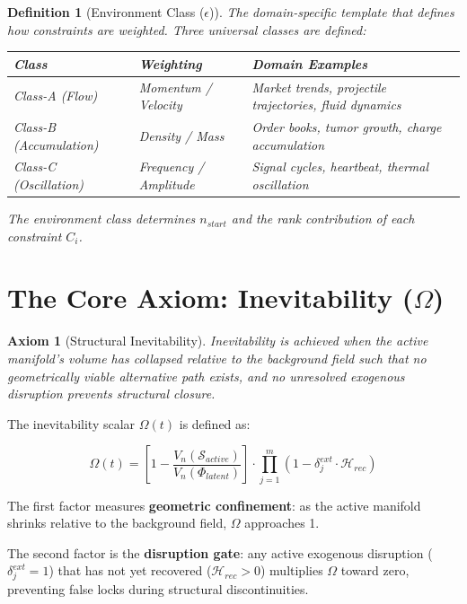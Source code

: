 \documentclass[11pt, a4paper]{article}
\newtheorem{definition}{Definition}[section]
\newtheorem{axiom}{Axiom}[section]
\begin{document}
\begin{definition}[Environment Class ($\epsilon$)]
The domain-specific template that defines how constraints are weighted.
Three universal classes are defined:
\begin{center}
\begin{tabular}{@{}lll@{}}
\toprule
\textbf{Class} & \textbf{Weighting} & \textbf{Domain Examples} \\
\midrule
Class-A (Flow)         & Momentum / Velocity   & Market trends, projectile trajectories, fluid dynamics \\
Class-B (Accumulation) & Density / Mass         & Order books, tumor growth, charge accumulation \\
Class-C (Oscillation)  & Frequency / Amplitude  & Signal cycles, heartbeat, thermal oscillation \\
\bottomrule
\end{tabular}
\end{center}
The environment class determines $n_{start}$ and the rank contribution of
each constraint $C_i$.
\end{definition}

\section{The Core Axiom: Inevitability ($\Omega$)}

\begin{axiom}[Structural Inevitability]
Inevitability is achieved when the active manifold's volume has collapsed
relative to the background field such that no geometrically viable
alternative path exists, and no unresolved exogenous disruption prevents
structural closure.
\end{axiom}

The inevitability scalar $\Omega(t)$ is defined as:

\begin{equation}
  \boxed{
    \Omega(t) = \left[ 1 - \frac{V_n(\mathcal{S}_{active})}{V_n(\Phi_{latent})} \right]
    \cdot \prod_{j=1}^{m} \left(1 - \delta_j^{ext} \cdot \mathcal{H}_{rec}\right)
  }
  \label{eq:omega}
\end{equation}

The first factor measures \textbf{geometric confinement}: as the active
manifold shrinks relative to the background field, $\Omega$ approaches 1.

The second factor is the \textbf{disruption gate}: any active exogenous
disruption ($\delta_j^{ext} = 1$) that has not yet recovered
($\mathcal{H}_{rec} > 0$) multiplies $\Omega$ toward zero, preventing
false locks during structural discontinuities.
\end{document}
